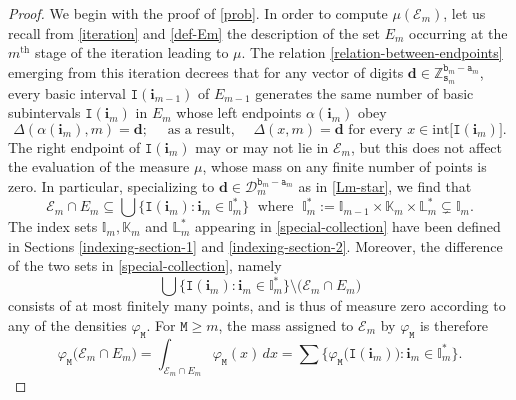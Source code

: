 \documentclass[12pt, twoside]{article}
\theoremstyle{definition}
\numberwithin{equation}{section}
\begin{document}
\begin{proof} 
We begin with the proof of \eqref{prob}. In order to compute $\mu(\mathscr{E}_m)$, let us recall from \eqref{iteration} and \eqref{def-Em} the description of the set $E_m$ occurring at the $m^{\text{th}}$ stage of the iteration leading to $\mu$. The relation \eqref{relation-between-endpoints} emerging from this iteration decrees that for any vector of digits $\mathbf d \in \mathbb Z_{\mathtt s_m}^{\mathtt b_m-\mathtt a_m}$, every basic interval  $\mathtt I(\mathbf i_{m-1})$ of $E_{m-1}$ generates the same number of basic subintervals $\mathtt I(\mathbf i_m)$ in $E_m$ whose left endpoints $\alpha(\mathbf i_m)$ obey
\[ \Delta(\alpha(\mathbf i_m), m) = \mathbf d; \quad \text{ as a result, } \quad \Delta(x, m) = \mathbf d \text{ for every } x \in \text{int}\bigl[ \mathtt I(\mathbf i_m) \bigr]. \]
The right endpoint of $\mathtt I(\mathbf i_m)$ may or may not lie in $\mathscr{E}_m$, but this does not affect the evaluation of the measure $\mu$, whose mass on any finite number of points is zero. In particular, specializing to $\mathbf d \in \mathscr{D}_m^{\mathtt b_m-\mathtt a_m}$ as in \eqref{Lm-star}, we find that  
\begin{equation}  
\mathscr{E}_m \cap E_m \subseteq \bigcup \bigl\{\mathtt I(\mathbf i_m): \mathbf i_m  \in \mathbb I_m^{\ast} \bigr\} \; \text{ where }  \; \mathbb I_m^{\ast} := \mathbb I_{m-1} \times \mathbb K_m \times \mathbb L_m^{\ast} \subsetneq \mathbb I_m. \label{special-collection}
\end{equation} 
The index sets $\mathbb I_m, \mathbb K_m$ and $\mathbb L_m^{\ast}$ appearing in \eqref{special-collection} have been defined in Sections \ref{indexing-section-1} and \ref{indexing-section-2}. Moreover, the difference of the two sets in \eqref{special-collection}, namely 
\[ \bigcup \bigl\{\mathtt I(\mathbf i_m): \mathbf i_m  \in \mathbb I_m^{\ast} \bigr\} \setminus \bigl(\mathscr{E}_m \cap E_m \bigr) \]  consists of at most finitely many points, and is thus of measure zero according to any of the densities $\varphi_{\mathtt M}$. For $\mathtt M \geq m$, the mass assigned to $\mathscr{E}_m$ by $\varphi_{\mathtt M}$ is therefore
\begin{equation*} 
\varphi_{\mathtt M} \bigl( \mathscr{E}_m \cap E_m \bigr) = \int_{\mathscr{E}_m \cap E_m} \varphi_{\mathtt M}(x) \, dx = \sum \bigl\{ \varphi_{\mathtt M} \bigl(\mathtt I(\mathbf i_m) \bigr) : \mathbf i_m \in \mathbb I_m^{\ast} \bigr\}.  
\end{equation*} 

\end{proof}
\end{document}
